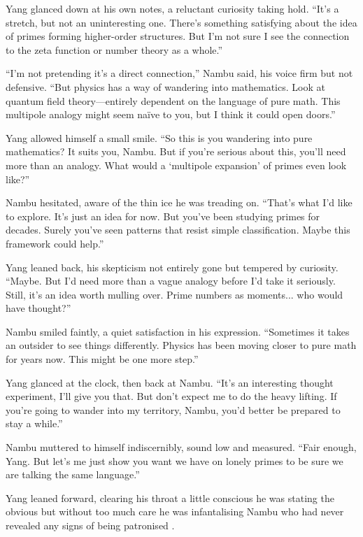 Yang glanced down at his own notes, a reluctant curiosity taking hold. “It’s a stretch, but not an uninteresting one. There’s something satisfying about the idea of primes forming higher-order structures. But I’m not sure I see the connection to the zeta function or number theory as a whole.”
\smallskip

“I’m not pretending it’s a direct connection,” Nambu said, his voice firm but not defensive. “But physics has a way of wandering into mathematics. Look at quantum field theory—entirely dependent on the language of pure math. This multipole analogy might seem naïve to you, but I think it could open doors.”
\smallskip

Yang allowed himself a small smile. “So this is you wandering into pure mathematics? It suits you, Nambu. But if you’re serious about this, you’ll need more than an analogy. What would a ‘multipole expansion’ of primes even look like?”
\smallskip

Nambu hesitated, aware of the thin ice he was treading on. “That’s what I’d like to explore. It’s just an idea for now. But you’ve been studying primes for decades. Surely you’ve seen patterns that resist simple classification. Maybe this framework could help.”
\smallskip

Yang leaned back, his skepticism not entirely gone but tempered by curiosity. “Maybe. But I’d need more than a vague analogy before I’d take it seriously. Still, it’s an idea worth mulling over. Prime numbers as moments... who would have thought?”
\smallskip

Nambu smiled faintly, a quiet satisfaction in his expression. “Sometimes it takes an outsider to see things differently. Physics has been moving closer to pure math for years now. This might be one more step.”
\smallskip

Yang glanced at the clock, then back at Nambu. “It’s an interesting thought experiment, I’ll give you that. But don’t expect me to do the heavy lifting. If you’re going to wander into my territory, Nambu, you’d better be prepared to stay a while.”
\smallskip

Nambu muttered to himself indiscernibly, sound low and measured. “Fair enough, Yang. But let’s me just show you want we have on lonely primes to be sure we are talking the same language.”
\smallskip

Yang leaned forward, clearing his throat a little conscious he was stating the obvious but without too much care he was infantalising Nambu who had never revealed any signs of being patronised  . 
\smallskip

